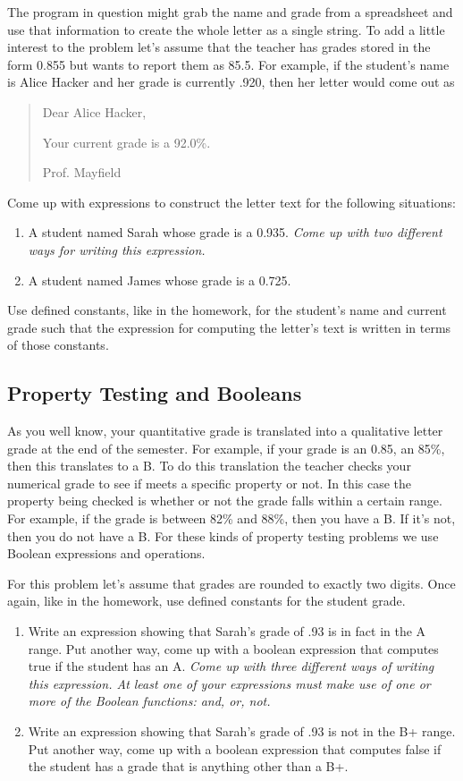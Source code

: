 \documentclass[nobib]{tufte-handout}
\begin{document}
The program in question might grab the name and grade from a spreadsheet and use that information to create the whole letter as a single string. To add a little interest to the problem let's assume that the teacher has grades stored in the form 0.855 but wants to report them as 85.5. For example, if the student's name is Alice Hacker and her grade is currently .920, then her letter would come out as

\begin{quote}
  Dear Alice Hacker,

  Your current grade is a 92.0\%.

  Prof. Mayfield
\end{quote}

Come up with expressions to construct the letter text for the following situations:
\begin{enumerate}
  \item A student named Sarah whose grade is a 0.935.  \textit{Come up with two different ways for writing this expression.}
  \item A student named James whose grade is a 0.725.
\end{enumerate}
Use defined constants, like in the homework, for the student's name and current grade such that the expression for computing the letter's text is written in terms of
those constants.

\subsection{Property Testing and Booleans}

As you well know, your quantitative grade is translated into a qualitative letter grade at the end of the semester. For example, if your grade is an 0.85, an 85\%, then this translates to a B. To do this translation the teacher checks your numerical grade to see if meets a specific property or not. In this case the property being checked is whether or not the grade falls within a certain range. For example, if the grade is between 82\% and 88\%, then you have a B.  If it's not, then you do not have a B. For these kinds of property testing problems we use Boolean expressions and operations.

For this problem let's assume that grades are rounded to exactly two digits. Once again, like in the homework, use defined constants for the student grade.
\begin{enumerate}
  \item Write an expression showing that Sarah's grade of .93 is in fact in the A range. Put another way, come up with a boolean expression that computes true if the student has an A. \textit{Come up with three different ways of writing this expression. At least one of your expressions must make use of one or more of the Boolean functions: and, or, not. }
  \item Write an expression showing that Sarah's grade of .93 is not in the B+ range. Put another way, come up with a boolean expression that computes false if the student has a grade that is anything other than a B+.
\end{enumerate}
\end{document}

